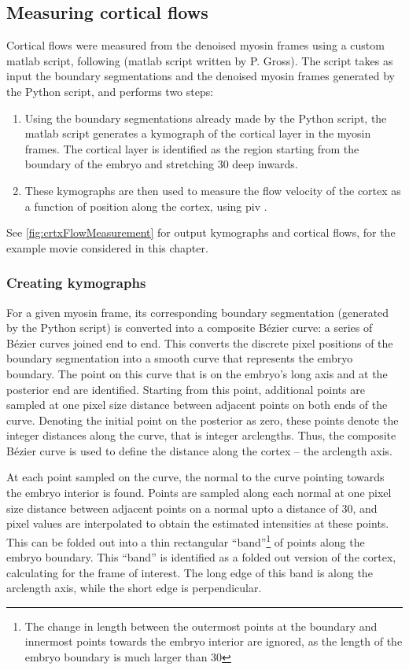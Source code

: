 \subsection{Measuring cortical flows}\label{subsec:corticalFlows}
Cortical flows were measured from the denoised myosin frames using a custom \ac{matlab} script, following \cite{gross2019guiding} (\ac{matlab} script written by P. Gross). The script takes as input the boundary segmentations and the denoised myosin frames generated by the Python script, and performs two steps:
\begin{enumerate}
    \item Using the boundary segmentations already made by the Python script, the \ac{matlab} script generates a kymograph of the cortical layer in the myosin frames. The cortical layer is identified as the region starting from the boundary of the embryo and stretching \SI{30}{\pixels} deep inwards.
    \item These kymographs are then used to measure the flow velocity of the cortex as a function of position along the cortex, using \ac{piv} \citep{thielicke2014pivlab}.
\end{enumerate}
See \autoref{fig:crtxFlowMeasurement} for output kymographs and cortical flows, for the example movie considered in this chapter.

\subsubsection{Creating kymographs}\label{subsubsec:kymographs}
For a given myosin frame, its corresponding boundary segmentation (generated by the Python script) is converted into a composite B{\'e}zier curve: a series of B{\'e}zier curves joined end to end. This converts the discrete pixel positions of the boundary segmentation into a smooth curve that represents the embryo boundary. The point on this curve that is on the embryo's long axis and at the posterior end are identified. Starting from this point, additional points are sampled at one pixel size distance between adjacent points on both ends of the curve. Denoting the initial point on the posterior as zero, these points denote the integer distances along the curve, that is integer arclengths. Thus, the composite B{\'e}zier curve is used to define the distance along the cortex -- the arclength axis. 

At each point sampled on the curve, the normal to the curve pointing towards the embryo interior is found. Points are sampled along each normal at one pixel size distance between adjacent points on a normal upto a distance of \SI{30}{\pixels}, and pixel values are interpolated to obtain the estimated intensities at these points. This can be folded out into a thin rectangular \enquote{band}\footnote{The change in length between the outermost points at the boundary and innermost points towards the embryo interior are ignored, as the length of the embryo boundary is much larger than \SI{30}{\pixels}} of points along the embryo boundary. This \enquote{band} is identified as a folded out version of the cortex, calculating for the frame of interest. The long edge of this band is along the arclength axis, while the short edge is perpendicular. 

